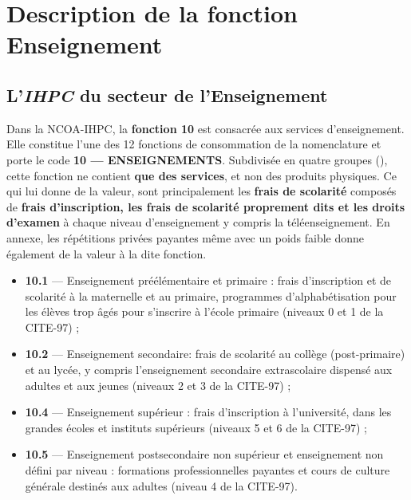 \documentclass[
12pt,          %
a4paper,       %
oneside,       %
openright      %
]{report}
\newcommand{\IHPC}{\textit{IHPC}}
\begin{document}
	
	\section{Description de la fonction Enseignement}
\subsection{L'\IHPC{} du secteur de l'Enseignement}

Dans la NCOA-IHPC, la \textbf{fonction 10} est consacrée aux services 
d'enseignement. Elle constitue l'une des 12 fonctions de consommation 
de la nomenclature et porte le code \textbf{10 --- ENSEIGNEMENTS}. Subdivisée en quatre groupes (\citep{afristat2022ncoa}), cette fonction ne contient \textbf{que des services}, et non des produits physiques. Ce qui lui donne de la valeur, sont principalement les \textbf{frais de scolarité} composés de  \textbf{frais d'inscription, les frais de scolarité proprement dits et les droits d'examen} à chaque niveau d'enseignement y compris la téléenseignement. En annexe, les répétitions privées payantes même avec un poids faible donne également de la valeur à la dite fonction.

\begin{itemize}
	\item \textbf{10.1} --- Enseignement préélémentaire et primaire : frais 
	d'inscription et de scolarité à la maternelle et au primaire, 
	programmes d'alphabétisation pour les élèves trop âgés pour 
	s'inscrire à l'école primaire (niveaux 0 et 1 de la CITE-97)  ;
	
	\item \textbf{10.2} --- Enseignement secondaire: frais de scolarité au 
	collège (post-primaire) et au lycée, y compris l'enseignement 
	secondaire extrascolaire dispensé aux adultes et aux jeunes 
	(niveaux 2 et 3 de la CITE-97) ;
	
	\item \textbf{10.4} --- Enseignement supérieur : frais d'inscription à 
	l'université, dans les grandes écoles et instituts supérieurs 
	(niveaux 5 et 6 de la CITE-97)  ;
	
	\item \textbf{10.5} --- Enseignement postsecondaire non supérieur 
	et enseignement non défini par niveau : formations professionnelles payantes et cours de culture 
	générale destinés aux adultes (niveau 4 de la CITE-97).
	
	\citep{afristat2022ncoa}
\end{itemize}
\end{document}
